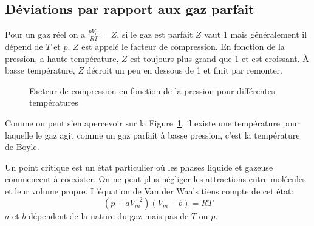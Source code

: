\subsection{Déviations par rapport aux gaz parfait}
Pour un gaz réel on a $\frac{pV_m}{RT} = Z$,
si le gaz est parfait $Z$ vaut 1 mais généralement il dépend de $T$ et $p$.
$Z$ est appelé le facteur de compression.
En fonction de la pression, a haute température,
$Z$ est toujours plus grand que 1 et est croissant.
À basse température, $Z$ décroit un peu en dessous de 1 et finit par remonter.
\begin{figure}[h]
  \begin{center}
  \end{center}
  \caption{Facteur de compression en fonction
  de la pression pour différentes températures}
  \label{fig:fact_comp}
\end{figure}

Comme on peut s'en apercevoir sur la Figure~\ref{fig:fact_comp},
il existe une température pour laquelle le gaz agit comme un gaz parfait
à basse pression, c'est la température de Boyle.

Un point critique est un état particulier où les phases liquide et
gazeuse commencent à coexister.
On ne peut plus négliger les attractions entre molécules et leur volume propre.
L'équation de Van der Waals tiens compte de cet état:
\[ (p+aV_m^{-2})(V_m-b) = RT \]
$a$ et $b$ dépendent de la nature du gaz mais pas de $T$ ou $p$.

